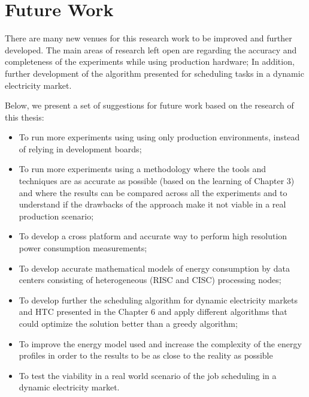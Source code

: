 \chapter{Future Work}

There are many new venues for this research work to be improved and further developed. The main areas of research left open are regarding the accuracy and completeness of the experiments while using production hardware; In addition, further development of the algorithm presented for scheduling tasks in a dynamic electricity market. 

\vspace{3mm}

Below, we present a set of suggestions for future work based on the research of this thesis:

\vspace{5mm}

\begin{itemize}
  \item To run more experiments using using only production environments, instead of relying in development boards;

  \item To run more experiments using a methodology where the tools and techniques are as accurate as possible (based on the learning of Chapter 3) and where the results can be compared across all the experiments and to understand if the drawbacks of the approach make it not viable in a real production scenario;

  \item To develop a cross platform and accurate way to perform high resolution power consumption measurements;

  \item To develop accurate mathematical models of energy consumption by data centers consisting of heterogeneous (RISC and CISC) processing nodes;

  \item To develop further the scheduling algorithm for dynamic electricity markets and HTC presented in the Chapter 6 and apply different algorithms that could optimize the solution better than a greedy algorithm;

  \item To improve the energy model used and increase the complexity of the energy profiles in order to the results to be as close to the reality as possible

  \item To test the viability in a real world scenario of the job scheduling in a dynamic electricity market.

\end{itemize}

